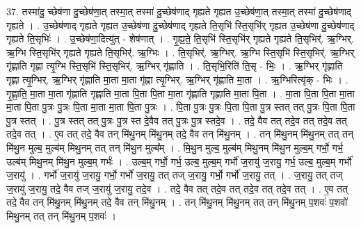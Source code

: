 \documentclass[17pt]{extarticle}
\begin{document}
37. तस्मा॑दु॒ च्छेष॑णा दु॒च्छेष॑णा॒त् तस्मा॒त् तस्मा॑ दु॒च्छेष॑णाद् गृह्यते गृह्यत उ॒च्छेष॑णा॒त् तस्मा॒त् तस्मा॑ दु॒च्छेष॑णाद् गृह्यते । . उ॒च्छेष॑णाद् गृह्यते गृह्यत उ॒च्छेष॑णा दु॒च्छेष॑णाद् गृह्यते ति॒सृभि॑ स्ति॒सृभि॑र् गृह्यत उ॒च्छेष॑णा दु॒च्छेष॑णाद् गृह्यते ति॒सृभिः॑ । . उ॒च्छेष॑णा॒दित्यु॑त् - शेष॑णात् । . गृ॒ह्य॒ते॒ ति॒सृभि॑ स्ति॒सृभि॑र् गृह्यते गृह्यते ति॒सृभिर्॑. ऋ॒ग्भिर्. ऋ॒ग्भि स्ति॒सृभि॑र् गृह्यते गृह्यते ति॒सृभिर्॑. ऋ॒ग्भिः । . ति॒सृभिर्॑. ऋ॒ग्भिर्. ऋ॒ग्भि स्ति॒सृभि॑ स्ति॒सृभिर्॑. ऋ॒ग्भिर् गृ॑ह्णाति गृह्णा त्यृ॒ग्भि स्ति॒सृभि॑ स्ति॒सृभिर्॑. ऋ॒ग्भिर् गृ॑ह्णाति । . ति॒सृभि॒रिति॑ ति॒सृ - भिः॒ । . ऋ॒ग्भिर् गृ॑ह्णाति गृह्णा त्यृ॒ग्भिर्. ऋ॒ग्भिर् गृ॑ह्णाति मा॒ता मा॒ता गृ॑ह्णा त्यृ॒ग्भिर्. ऋ॒ग्भिर् गृ॑ह्णाति मा॒ता । . ऋ॒ग्भिरित्यृ॑क् - भिः । . गृ॒ह्णा॒ति॒ मा॒ता मा॒ता गृ॑ह्णाति गृह्णाति मा॒ता पि॒ता पि॒ता मा॒ता गृ॑ह्णाति गृह्णाति मा॒ता पि॒ता । . मा॒ता पि॒ता पि॒ता मा॒ता मा॒ता पि॒ता पु॒त्रः पु॒त्रः पि॒ता मा॒ता मा॒ता पि॒ता पु॒त्रः । . पि॒ता पु॒त्रः पु॒त्रः पि॒ता पि॒ता पु॒त्र स्तत् तत् पु॒त्रः पि॒ता पि॒ता पु॒त्र स्तत् । . पु॒त्र स्तत् तत् पु॒त्रः पु॒त्र स्त दे॒वैव तत् पु॒त्रः पु॒त्र स्तदे॒व । . तदे॒ वैव तत् तदे॒व तत् तदे॒व तत् तदे॒व तत् । . ए॒व तत् तदे॒ वैव तन् मि॑थु॒नम् मि॑थु॒नम् तदे॒ वैव तन् मि॑थु॒नम् । . तन् मि॑थु॒नम् मि॑थु॒नम् तत् तन् मि॑थु॒न मुल्ब॒ मुल्ब॑म् मिथु॒नम् तत् तन् मि॑थु॒न मुल्ब᳚म् । . मि॒थु॒न मुल्ब॒ मुल्ब॑म् मिथु॒नम् मि॑थु॒न मुल्ब॒म् गर्भो॒ गर्भ॒ उल्ब॑म् मिथु॒नम् मि॑थु॒न मुल्ब॒म् गर्भः॑ । . उल्ब॒म् गर्भो॒ गर्भ॒ उल्ब॒ मुल्ब॒म् गर्भो॑ ज॒रायु॑ ज॒रायु॒ गर्भ॒ उल्ब॒ मुल्ब॒म् गर्भो॑ ज॒रायु॑ । . गर्भो॑ ज॒रायु॑ ज॒रायु॒ गर्भो॒ गर्भो॑ ज॒रायु॒ तत् तज् ज॒रायु॒ गर्भो॒ गर्भो॑ ज॒रायु॒ तत् । . ज॒रायु॒ तत् तज् ज॒रायु॑ ज॒रायु॒ तदे॒ वैव तज् ज॒रायु॑ ज॒रायु॒ तदे॒व । . तदे॒ वैव तत् तदे॒व तत् तदे॒व तत् तदे॒व तत् । . ए॒व तत् तदे॒ वैव तन् मि॑थु॒नम् मि॑थु॒नम् तदे॒ वैव तन् मि॑थु॒नम् । . तन् मि॑थु॒नम् मि॑थु॒नम् तत् तन् मि॑थु॒नम् प॒शवः॑ प॒शवो॑ मिथु॒नम् तत् तन् मि॑थु॒नम् प॒शवः॑ । \newline
\pagebreak
{}
\end{document}
